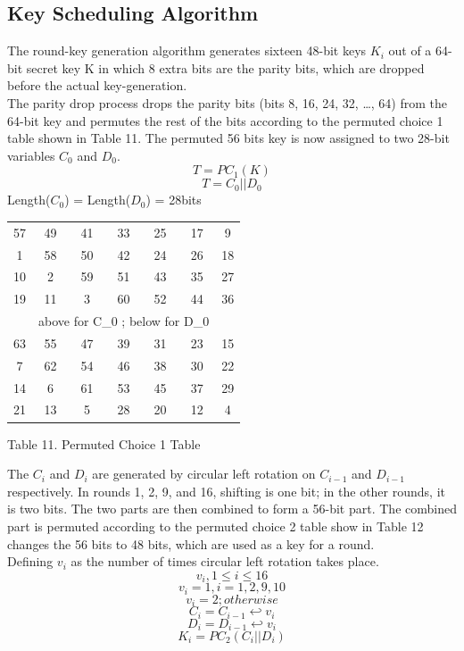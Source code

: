 \documentclass[11pt]{article}
\begin{document}
\subsection*{Key Scheduling Algorithm}
The round-key generation algorithm generates sixteen 48-bit keys $K_i$ out of a 64-bit secret key K in which 8 extra bits are the parity bits, which are dropped before the actual key-generation. 
\\

The parity drop process drops the parity bits (bits 8, 16, 24, 32, …, 64) from the 64-bit key and permutes the rest of the bits according to the permuted choice 1 table shown in Table 11. The permuted 56 bits key is now assigned to two 28-bit variables $C_0$ and $D_0$.
\[ T = PC_1(K) \]
\[ T = C_0 || D_0 \]
Length($C_0$) = Length($D_0$) = 28bits
\begin{center}
\begin{tabular}{ | c | c | c |c | c | c | c |}
  \hline
    57&	49&	41&	33& 25& 17& 9\\
    1&	58&	50&	42& 24& 26& 18\\
    10&	2&	59&	51& 43& 35& 27\\
    19& 11&	3& 60& 52& 44& 36\\
    &\multicolumn{5}{c}{above for C_0 ; below for D_0}& \hspace{} \\
    63&	55&	47&	39& 31& 23& 15\\
    7&	62&	54&	46& 38& 30& 22\\
    14&	6&	61&	53& 45& 37& 29\\
    21&	13&	5&	28& 20& 12& 4\\
  \hline
\end{tabular}
\end{center}
\begin{center}
Table 11. Permuted Choice 1 Table
\end{center}

The $C_i$ and $D_i$ are generated by circular left rotation on $C_{i-1}$ and $D_{i-1}$ respectively. In rounds 1, 2, 9, and 16, shifting is one bit; in the other rounds, it is two bits. The two parts are then combined to form a 56-bit part. The combined part is permuted according to the permuted choice 2 table show in Table 12 changes the 56 bits to 48 bits, which are used as a key for a round.
\\

Defining $v_i$ as the number of times circular left rotation takes place. 
\[v_i , 1\leq i \leq16 \]
\[v_i=1 , i=1,2,9,10 \]
\[v_i=2 ; otherwise \]
\[ C_i = C_{i-1} \hookleftarrow v_i \]
\[ D_i = D_{i-1} \hookleftarrow v_i \]
\[ K_i = PC_2(C_i || D_i) \]
\end{document}
